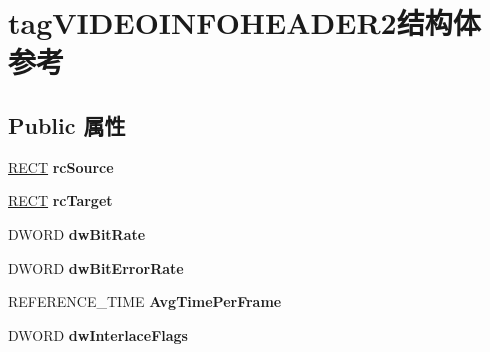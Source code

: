 \hypertarget{structtag_v_i_d_e_o_i_n_f_o_h_e_a_d_e_r2}{}\section{tag\+V\+I\+D\+E\+O\+I\+N\+F\+O\+H\+E\+A\+D\+E\+R2结构体 参考}
\label{structtag_v_i_d_e_o_i_n_f_o_h_e_a_d_e_r2}
\subsection*{Public 属性}
\begin{DoxyCompactItemize}
\item 
\mbox{\label{structtag_v_i_d_e_o_i_n_f_o_h_e_a_d_e_r2_a2ac8004d801d36db9a45b7eb3af9d093}} 
\hyperlink{structtag_r_e_c_t}{R\+E\+CT} {\bfseries rc\+Source}
\item 
\mbox{\label{structtag_v_i_d_e_o_i_n_f_o_h_e_a_d_e_r2_a54a71836e3f6e3cb1f17f81afd16fa6f}} 
\hyperlink{structtag_r_e_c_t}{R\+E\+CT} {\bfseries rc\+Target}
\item 
\mbox{\label{structtag_v_i_d_e_o_i_n_f_o_h_e_a_d_e_r2_ab79d73af7bceeaa94ba9e51016454838}} 
D\+W\+O\+RD {\bfseries dw\+Bit\+Rate}
\item 
\mbox{\label{structtag_v_i_d_e_o_i_n_f_o_h_e_a_d_e_r2_a7d448c68737e26a7809770d7a554c563}} 
D\+W\+O\+RD {\bfseries dw\+Bit\+Error\+Rate}
\item 
\mbox{\label{structtag_v_i_d_e_o_i_n_f_o_h_e_a_d_e_r2_a981b5c6bc4c5546a197ab5bd55712448}} 
R\+E\+F\+E\+R\+E\+N\+C\+E\+\_\+\+T\+I\+ME {\bfseries Avg\+Time\+Per\+Frame}
\item 
\mbox{\label{structtag_v_i_d_e_o_i_n_f_o_h_e_a_d_e_r2_a776bc65bd97fb16c44b7fafeaa6dadc3}} 
D\+W\+O\+RD {\bfseries dw\+Interlace\+Flags}
\item 
\mbox{\label{structtag_v_i_d_e_o_i_n_f_o_h_e_a_d_e_r2_a282b29ff37e7a17751a0ca74a1031706}} 

\end{DoxyCompactItemize}

